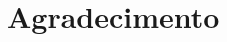 \documentclass[conference]{IEEEtran}
\begin{document}
%







\section*{Agradecimento}


\end{document}
